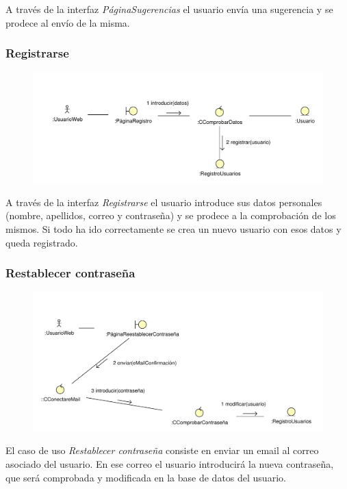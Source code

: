 \documentclass[11pt, a4paper, twoside, titlepage]{article}
\begin{document}
					A través de la interfaz {\itshape PáginaSugerencias} el usuario envía una sugerencia y se prodece al envío de la misma.

			\subsubsection{Registrarse}
				\begin{figure}[H]\centering
					\includegraphics[scale=.8]{diagramas/registrarse.pdf}
				\end{figure}

					A través de la interfaz {\itshape Registrarse} el usuario introduce sus datos personales (nombre, apellidos, correo y contraseña) y se prodece a la comprobación de los mismos. Si todo ha ido correctamente se crea un nuevo usuario con esos datos y queda registrado.

			\subsubsection{Restablecer contraseña}
				\begin{figure}[H]\centering
					\includegraphics[scale=.77]{diagramas/restablecercontrasena.pdf}
				\end{figure}

					El caso de uso {\itshape Restablecer contraseña} consiste en enviar un email  al correo asociado del usuario. En ese correo el usuario introducirá la nueva contraseña, que será comprobada y modificada en la base de datos del usuario.
\end{document}
